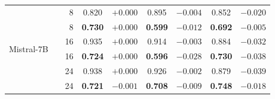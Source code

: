 \begin{table}[t]
\begin{tabular}{llr|cc|cc|cc}
\midrule
\multirow{6}{*}{Mistral-7B}
 & \AmbGCE{}          & 8  & 0.820 & $+0.000$ & 0.895 & $-0.004$ & 0.852 & $-0.020$ \\
 & \textbf{\TanGCE{}} & 8  & \textbf{0.730} & $+0.000$ & \textbf{0.599} & $-0.012$ & \textbf{0.692} & $-0.005$ \\
 & \AmbGCE{}          & 16 & 0.935 & $+0.000$ & 0.914 & $-0.003$ & 0.884 & $-0.032$ \\
 & \textbf{\TanGCE{}} & 16 & \textbf{0.724} & $+0.000$ & \textbf{0.596} & $-0.028$ & \textbf{0.730} & $-0.038$ \\
 & \AmbGCE{}          & 24 & 0.938 & $+0.000$ & 0.926 & $-0.002$ & 0.879 & $-0.039$ \\
 & \textbf{\TanGCE{}} & 24 & \textbf{0.721} & $-0.001$ & \textbf{0.708} & $-0.009$ & \textbf{0.748} & $-0.018$ \\
\bottomrule
\end{tabular}
\end{table}
